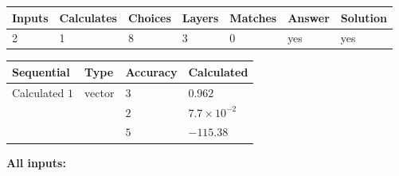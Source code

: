 \documentclass[12pt]{article}
\begin{document}
 
 
\noindent{}
 
 

 
\vspace{0.3in}
   
   
   
   
\noindent\begin{tabular}{|l|l|l|l|l|l|l|}
 \hline
Inputs & Calculates & Choices & Layers & Matches & Answer & Solution \\ \hline
           2  & 
           1  & 
           8
  & 
           3  & 
           0  & 
  yes & 
  yes 
  \\ \hline
 \end{tabular}
   
   
   
   
\noindent{}
   
   
  
  
\noindent\begin{tabular}{|l|l|l|l|}
\hline
 Sequential & Type & Accuracy & Calculated \\ 
\hline
 
 
  Calculated $            1 $ & vector &  
  $            3  $ 
 &  $ 0.962 $ 
 \\    
  & & 
  $            2  $ 
 &  $ 7.7 \times 10^{-2} $ 
 \\    
  & & 
  $            5  $ 
 &  $ -115.38 $ 
 \\  \hline  
 \end{tabular}
   
   
   
   
\noindent\vspace{0.1in}\hspace{-0.08in} {\textbf{\Large{All inputs: }}}
   
   
  
\end{document}
